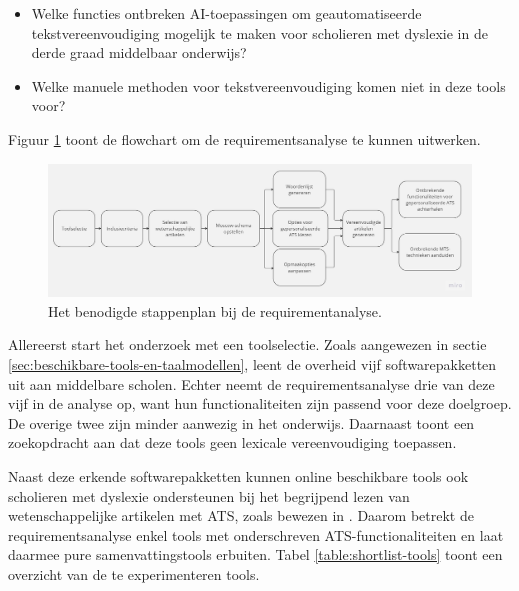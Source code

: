 \begin{itemize}
	\item Welke functies ontbreken AI-toepassingen om geautomatiseerde tekstvereenvoudiging mogelijk te maken voor scholieren met dyslexie in de derde graad middelbaar onderwijs?
	\item Welke manuele methoden voor tekstvereenvoudiging komen niet in deze tools voor?
\end{itemize}

Figuur \ref{img:flowchart-requirementsanalyse} toont de flowchart om de requirementsanalyse te kunnen uitwerken.

\begin{figure}[H]
	\includegraphics[width=\linewidth]{img/flowchart-requirementsanalyse.jpg}
	\caption{Het benodigde stappenplan bij de requirementanalyse.}
	\label{img:flowchart-requirementsanalyse}
\end{figure}

Allereerst start het onderzoek met een toolselectie. Zoals aangewezen in sectie \ref{sec:beschikbare-tools-en-taalmodellen}, leent de overheid vijf softwarepakketten uit aan middelbare scholen. Echter neemt de requirementsanalyse drie van deze vijf in de analyse op, want hun functionaliteiten zijn passend voor deze doelgroep. De overige twee zijn minder aanwezig in het onderwijs. Daarnaast toont een zoekopdracht aan dat deze tools geen lexicale vereenvoudiging toepassen. 

Naast deze erkende softwarepakketten kunnen online beschikbare tools ook scholieren met dyslexie ondersteunen bij het begrijpend lezen van wetenschappelijke artikelen met ATS, zoals bewezen in \textcite{Bingel2018}. Daarom betrekt de requirementsanalyse enkel tools met onderschreven ATS-functionaliteiten en laat daarmee pure samenvattingstools erbuiten. Tabel \ref{table:shortlist-tools} toont een overzicht van de te experimenteren tools.

